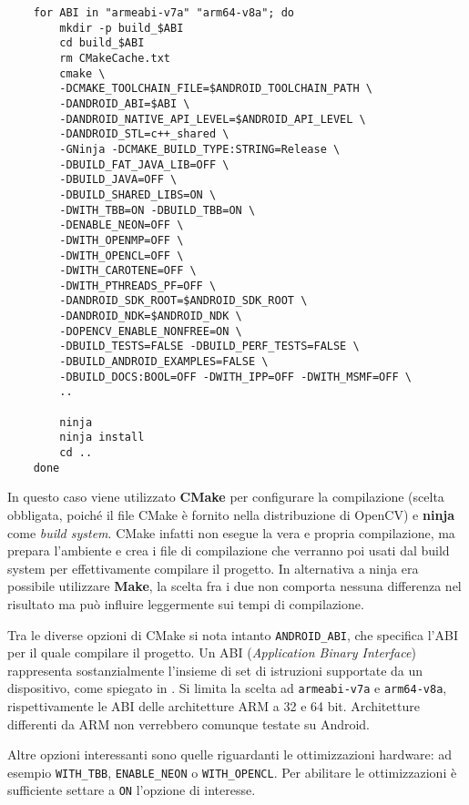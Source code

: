 
\begin{verbatim}
    for ABI in "armeabi-v7a" "arm64-v8a"; do
        mkdir -p build_$ABI
        cd build_$ABI
        rm CMakeCache.txt
        cmake \
        -DCMAKE_TOOLCHAIN_FILE=$ANDROID_TOOLCHAIN_PATH \
        -DANDROID_ABI=$ABI \
        -DANDROID_NATIVE_API_LEVEL=$ANDROID_API_LEVEL \
        -DANDROID_STL=c++_shared \
        -GNinja -DCMAKE_BUILD_TYPE:STRING=Release \
        -DBUILD_FAT_JAVA_LIB=OFF \
        -DBUILD_JAVA=OFF \
        -DBUILD_SHARED_LIBS=ON \
        -DWITH_TBB=ON -DBUILD_TBB=ON \
        -DENABLE_NEON=OFF \
        -DWITH_OPENMP=OFF \
        -DWITH_OPENCL=OFF \
        -DWITH_CAROTENE=OFF \
        -DWITH_PTHREADS_PF=OFF \
        -DANDROID_SDK_ROOT=$ANDROID_SDK_ROOT \
        -DANDROID_NDK=$ANDROID_NDK \
        -DOPENCV_ENABLE_NONFREE=ON \
        -DBUILD_TESTS=FALSE -DBUILD_PERF_TESTS=FALSE \
        -DBUILD_ANDROID_EXAMPLES=FALSE \
        -DBUILD_DOCS:BOOL=OFF -DWITH_IPP=OFF -DWITH_MSMF=OFF \
        ..
    
        ninja
        ninja install
        cd ..
    done
\end{verbatim}

In questo caso viene utilizzato \textbf{CMake} per configurare la compilazione (scelta obbligata, poiché il file CMake è fornito 
nella distribuzione di OpenCV) e \textbf{ninja} come \textit{build system}. 
CMake infatti non esegue la vera e propria compilazione, ma prepara l'ambiente e crea i file di compilazione che 
verranno poi usati dal build system per effettivamente compilare il progetto. In alternativa a ninja era possibile 
utilizzare \textbf{Make}, la scelta fra i due non comporta nessuna differenza nel risultato ma può influire leggermente 
sui tempi di compilazione.

Tra le diverse opzioni di CMake si nota intanto \texttt{ANDROID\_ABI}, che specifica l'ABI per il quale compilare il
progetto. Un ABI (\textit{Application Binary Interface}) rappresenta sostanzialmente l'insieme di set di istruzioni
supportate da un dispositivo, come spiegato in \cite{adev_abi}. 
Si limita la scelta ad \texttt{armeabi-v7a} e \texttt{arm64-v8a}, rispettivamente le ABI delle architetture ARM a 32 e 64 bit. 
Architetture differenti da ARM non verrebbero comunque testate su Android.

Altre opzioni interessanti sono quelle riguardanti le ottimizzazioni hardware: ad esempio \texttt{WITH\_TBB}, 
\texttt{ENABLE\_NEON} o \texttt{WITH\_OPENCL}. Per abilitare le ottimizzazioni è sufficiente settare a \texttt{ON}
l'opzione di interesse.

